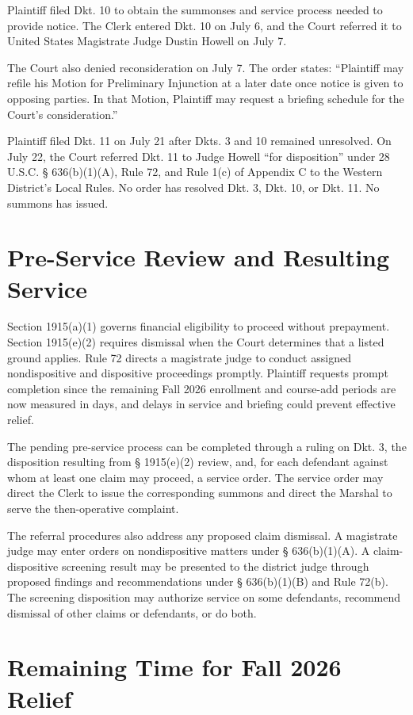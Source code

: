 \documentclass[12pt]{article}
\begin{document}
Plaintiff filed Dkt. 10 to obtain the summonses and service process needed to provide notice. The Clerk entered Dkt. 10 on July 6, and the Court referred it to United States Magistrate Judge Dustin Howell on July 7.

The Court also denied reconsideration on July 7. The order states: ``Plaintiff may refile his Motion for Preliminary Injunction at a later date once notice is given to opposing parties. In that Motion, Plaintiff may request a briefing schedule for the Court's consideration.''

Plaintiff filed Dkt. 11 on July 21 after Dkts. 3 and 10 remained unresolved. On July 22, the Court referred Dkt. 11 to Judge Howell ``for disposition'' under 28 U.S.C. § 636(b)(1)(A), Rule 72, and Rule 1(c) of Appendix C to the Western District's Local Rules. No order has resolved Dkt. 3, Dkt. 10, or Dkt. 11. No summons has issued.

\section*{Pre-Service Review and Resulting Service}

Section 1915(a)(1) governs financial eligibility to proceed without prepayment. Section 1915(e)(2) requires dismissal when the Court determines that a listed ground applies. Rule 72 directs a magistrate judge to conduct assigned nondispositive and dispositive proceedings promptly. Plaintiff requests prompt completion since the remaining Fall 2026 enrollment and course-add periods are now measured in days, and delays in service and briefing could prevent effective relief.

The pending pre-service process can be completed through a ruling on Dkt. 3, the disposition resulting from § 1915(e)(2) review, and, for each defendant against whom at least one claim may proceed, a service order. The service order may direct the Clerk to issue the corresponding summons and direct the Marshal to serve the then-operative complaint.

The referral procedures also address any proposed claim dismissal. A magistrate judge may enter orders on nondispositive matters under § 636(b)(1)(A). A claim-dispositive screening result may be presented to the district judge through proposed findings and recommendations under § 636(b)(1)(B) and Rule 72(b). The screening disposition may authorize service on some defendants, recommend dismissal of other claims or defendants, or do both.

\section*{Remaining Time for Fall 2026 Relief}
\end{document}
